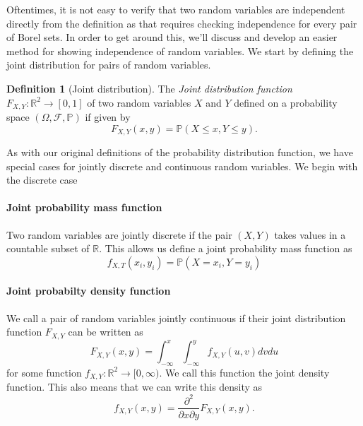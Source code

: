 \documentclass[12pt]{article}
\newcommand{\bbR}{\mathbb{R}}
\newcommand{\calF}{\mathcal{F}}
\newcommand{\Prob}{\mathbb{P}}
\theoremstyle{definition}
\newtheorem{defn}[thm]{Definition}
\theoremstyle{remark}
\numberwithin{equation}{section}
\begin{document}
Oftentimes, it is not easy to verify that two random variables are independent directly from the definition as that requires checking independence for every pair of Borel sets. In order to get around this, we'll discuss and develop an easier method for showing independence of random variables. We start by defining the joint distribution for pairs of random variables.

\begin{defn}[Joint distribution]
  The \emph{Joint distribution function} $F_{X,Y}: \bbR^2 \to [0,1]$ of two random variables $X$ and $Y$ defined on a probability space $(\Omega, \calF, \Prob)$ if given by 
\begin{equation}
  F_{X,Y}(x,y) = \Prob( X \leq x, Y \leq y).
\end{equation}
\end{defn}

As with our original definitions of the probability distribution function, we have special cases for jointly discrete and continuous random variables. We begin with the discrete case

\paragraph{Joint probability mass function}%
\label{par:joint_probability_mass}


  Two random variables are jointly discrete if the pair $(X,Y)$ takes values in a countable subset of $\bbR$. This allows us define a joint probability mass function as 
  \begin{equation}
  f_{X,T}(x_i, y_i) = \Prob(X = x_i, Y = y_i)
  \end{equation}

  \paragraph{Joint probabilty density function}%
  \label{par:joint_probabilty_density_function}
  
  We call a pair of random variables jointly continuous if their joint distribution function $F_{X,Y}$ can be written as 
  \begin{equation}
    F_{X,Y}(x,y) = \int_{-\infty}^x\int_{-\infty}^y f_{X,Y}(u,v)dvdu
  \end{equation}
  for some function $f_{X,Y}\colon \bbR^2 \to [0, \infty)$. We call this function the joint density function. This also means that we can write this density as
  \begin{equation}
    f_{X,Y}(x,y) = \frac{\partial^2}{\partial x \partial y}F_{X,Y}(x,y).
  \end{equation}
\end{document}
